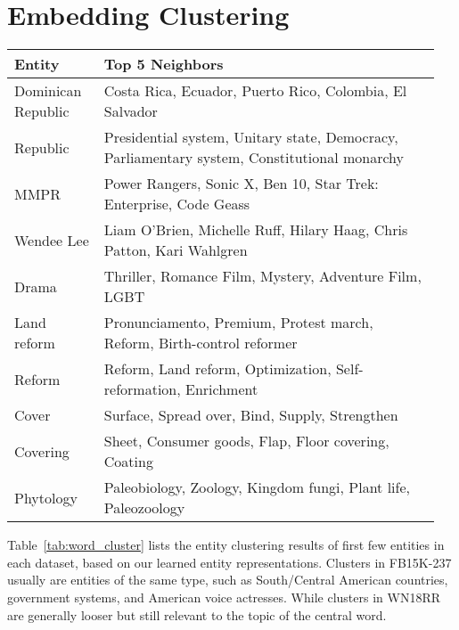 \documentclass[11pt]{article}
\begin{document}
\section{Embedding Clustering}
\begin{table*}[tb]
\centering
\begin{tabular}{p{0.2\linewidth}p{0.75\linewidth}}
\toprule
Entity    & Top 5 Neighbors \\\midrule
Dominican Republic & Costa Rica, Ecuador, Puerto Rico, Colombia, El Salvador  \\
Republic & Presidential system, Unitary state, Democracy, Parliamentary system, Constitutional monarchy  \\
MMPR & Power Rangers, Sonic X, Ben 10, Star Trek: Enterprise, Code Geass  \\
Wendee Lee & Liam O'Brien, Michelle Ruff, Hilary Haag, Chris Patton, Kari Wahlgren  \\
Drama & Thriller, Romance Film, Mystery, Adventure Film, LGBT  \\
\midrule
Land reform& Pronunciamento, Premium, Protest march, Reform, Birth-control reformer\\
Reform& Reform, Land reform, Optimization, Self-reformation, Enrichment\\
Cover& Surface, Spread over, Bind, Supply, Strengthen\\
Covering& Sheet, Consumer goods, Flap, Floor covering, Coating\\
Phytology& Paleobiology, Zoology, Kingdom fungi, Plant life, Paleozoology\\
\bottomrule
\end{tabular}
\caption{Nearest neighbors of first five entities in FB15K-237 and WN18RR based on the cosine similarity between learned entity embeddings from our proposed method.}
\label{tab:word_cluster}
\end{table*} Table~\ref{tab:word_cluster} lists the entity clustering results of first few entities in each dataset, based on our learned entity representations. Clusters in FB15K-237 usually are entities of the same type, such as South/Central American countries, government systems, and American voice actresses.
While clusters in WN18RR are generally looser but still relevant to the topic of the central word.
\end{document}
